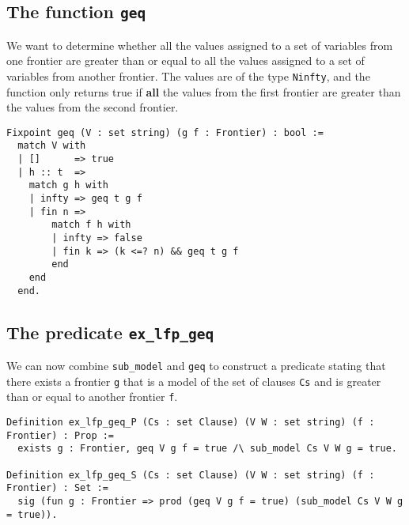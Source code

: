 \subsection{The function \lstinline{geq}}

We want to determine whether all the values assigned to a set of variables
from one frontier are greater than or equal to all the values assigned to a set of variables
from another frontier. The values are of the type \lstinline{Ninfty}, and the function
only returns true if \textbf{all} the values from the first frontier are greater than
the values from the second frontier.

\begin{minipage}{\linewidth}
\begin{lstlisting}[language=Coq, label={lst:geq_def}, caption={Point-wise comparing frontiers with \lstinline{geq} in Coq}]
Fixpoint geq (V : set string) (g f : Frontier) : bool :=
  match V with
  | []      => true
  | h :: t  =>
    match g h with
    | infty => geq t g f
    | fin n =>
        match f h with
        | infty => false
        | fin k => (k <=? n) && geq t g f
        end
    end
  end.
\end{lstlisting}
\end{minipage}

\subsection{The predicate \lstinline{ex_lfp_geq}}
\label{ssec:ex_lfp_geq}

We can now combine \lstinline{sub_model} and \lstinline{geq} to construct a predicate
stating that there exists a frontier \lstinline{g} that is a model of the set of clauses \lstinline{Cs}
and is greater than or equal to another frontier \lstinline{f}.

\begin{minipage}{\linewidth}
\begin{lstlisting}[language=Coq, label={lst:ex_lfp_geq_def}, caption={\lstinline{ex_lfp_geq} in Coq, using both \lstinline{Prop} and \lstinline{Set}}]
Definition ex_lfp_geq_P (Cs : set Clause) (V W : set string) (f : Frontier) : Prop :=
  exists g : Frontier, geq V g f = true /\ sub_model Cs V W g = true.

Definition ex_lfp_geq_S (Cs : set Clause) (V W : set string) (f : Frontier) : Set :=
  sig (fun g : Frontier => prod (geq V g f = true) (sub_model Cs V W g = true)).
\end{lstlisting}
\end{minipage}

